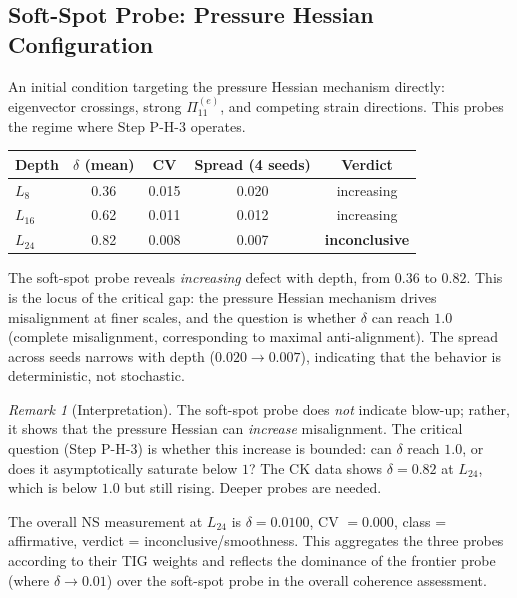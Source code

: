\documentclass[11pt]{article}
\theoremstyle{definition}
\theoremstyle{remark}
\newtheorem{remark}[theorem]{Remark}
\begin{document}
\subsection{Soft-Spot Probe: Pressure Hessian Configuration}

An initial condition targeting the pressure Hessian mechanism directly: eigenvector
crossings, strong $\Pi_{11}^{(e)}$, and competing strain directions.  This probes
the regime where Step P-H-3 operates.
\begin{center}
\begin{tabular}{lcccc}
\hline
Depth & $\delta$ (mean) & CV & Spread (4 seeds) & Verdict \\
\hline
$L_8$  & 0.36 & 0.015 & 0.020 & increasing \\
$L_{16}$ & 0.62 & 0.011 & 0.012 & increasing \\
$L_{24}$ & 0.82 & 0.008 & 0.007 & \textbf{inconclusive} \\
\hline
\end{tabular}
\end{center}

The soft-spot probe reveals \emph{increasing} defect with depth, from $0.36$ to $0.82$.
This is the locus of the critical gap:  the pressure Hessian mechanism drives
misalignment at finer scales, and the question is whether $\delta$ can reach $1.0$
(complete misalignment, corresponding to maximal anti-alignment).  The spread across
seeds narrows with depth ($0.020 \to 0.007$), indicating that the behavior is
deterministic, not stochastic.

\begin{remark}[Interpretation]
The soft-spot probe does \emph{not} indicate blow-up; rather, it shows that the
pressure Hessian can \emph{increase} misalignment.  The critical question (Step P-H-3)
is whether this increase is bounded: can $\delta$ reach $1.0$, or does it
asymptotically saturate below $1$?  The CK data shows $\delta = 0.82$ at $L_{24}$,
which is below $1.0$ but still rising.  Deeper probes are needed.

The overall NS measurement at $L_{24}$ is $\delta = 0.0100$, CV $= 0.000$,
class = affirmative, verdict = inconclusive/smoothness.  This aggregates the three
probes according to their TIG weights and reflects the dominance of the frontier
probe (where $\delta \to 0.01$) over the soft-spot probe in the overall coherence
assessment.
\end{remark}

\end{document}
